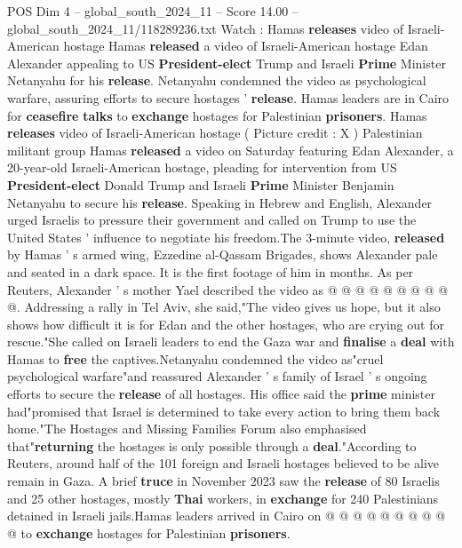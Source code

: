 \begin{textsample}{POS Dim 4 – global\_south\_2024\_11 – Score 14.00 – global\_south\_2024\_11/118289236.txt}  \label{ex:f4_pos_290}
Watch : Hamas \textbf{releases} video of Israeli-American hostage Hamas \textbf{released} a video of Israeli-American hostage Edan Alexander appealing to US \textbf{President-elect} Trump and Israeli \textbf{Prime} Minister Netanyahu for his \textbf{release}.
Netanyahu condemned the video as psychological warfare, assuring efforts to secure hostages ' \textbf{release}.
Hamas leaders are in Cairo for \textbf{ceasefire} \textbf{talks} to \textbf{exchange} hostages for Palestinian \textbf{prisoners}.
Hamas \textbf{releases} video of Israeli-American hostage ( Picture credit : X ) Palestinian militant group Hamas \textbf{released} a video on Saturday featuring Edan Alexander, a 20-year-old Israeli-American hostage, pleading for intervention from US \textbf{President-elect} Donald Trump and Israeli \textbf{Prime} Minister Benjamin Netanyahu to secure his \textbf{release}.
Speaking in Hebrew and English, Alexander urged Israelis to pressure their government and called on Trump to use the United States ' influence to negotiate his freedom.The 3-minute video, \textbf{released} by Hamas ' s armed wing, Ezzedine al-Qassam Brigades, shows Alexander pale and seated in a dark space.
It is the first footage of him in months.
As per Reuters, Alexander ' s mother Yael described the video as @ @ @ @ @ @ @ @ @ @.
Addressing a rally in Tel Aviv, she said,"The video gives us hope, but it also shows how difficult it is for Edan and the other hostages, who are crying out for rescue."She called on Israeli leaders to end the Gaza war and \textbf{finalise} a \textbf{deal} with Hamas to \textbf{free} the captives.Netanyahu condemned the video as"cruel psychological warfare"and reassured Alexander ' s family of Israel ' s ongoing efforts to secure the \textbf{release} of all hostages.
His office said the \textbf{prime} minister had"promised that Israel is determined to take every action to bring them back home."The Hostages and Missing Families Forum also emphasised that"\textbf{returning} the hostages is only possible through a \textbf{deal}."According to Reuters, around half of the 101 foreign and Israeli hostages believed to be alive remain in Gaza.
A brief \textbf{truce} in November 2023 saw the \textbf{release} of 80 Israelis and 25 other hostages, mostly \textbf{Thai} workers, in \textbf{exchange} for 240 Palestinians detained in Israeli jails.Hamas leaders arrived in Cairo on @ @ @ @ @ @ @ @ @ @ to \textbf{exchange} hostages for Palestinian \textbf{prisoners}.

\end{textsample}
